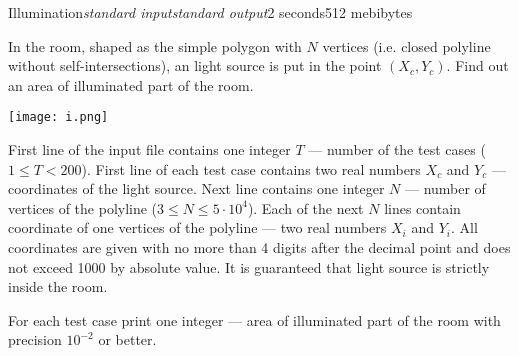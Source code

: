 \begin{problem}{Illumination}{\textsl{standard input}}{\textsl{standard output}}{2 seconds}{512 mebibytes}{}

In the room, shaped as the simple polygon with $N$ vertices (i.e. closed
polyline without self-intersections), an light source is put in the 
point $(X_c,Y_c)$. Find out an area of illuminated part of the room.

\texttt{[image: i.png]}


\InputFile

First line of the input file contains one integer $T$ --- number of the
test cases ($1 \le T <200$). First line of each test case contains 
two real numbers $X_c$ and $Y_c$ --- coordinates of the light source.
Next line contains one integer $N$ --- number of vertices of the polyline
($3 \le N \le 5 \cdot 10^4$). Each of the next $N$ lines contain
coordinate of one vertices of the polyline --- two real numbers
$X_i$ and $Y_i$. All coordinates are given with no more than 4 digits
after the decimal point and does not exceed 1000 by absolute value. 
It is guaranteed that light source is strictly inside the room.

\OutputFile

For each test case print one integer --- area of illuminated part of the room
with precision $10^{-2}$ or better.


\Examples
\begin{example}
%
\end{example}
\end{problem}
